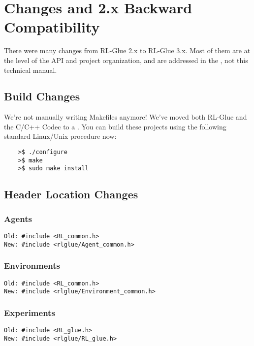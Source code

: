 \documentclass[11pt]{article}
\begin{document}
\section{Changes and 2.x Backward Compatibility}
There were many changes from RL-Glue 2.x to RL-Glue 3.x.  Most of them are at the level of the API and project organization, and are addressed in the , not this technical manual.

\subsection{Build Changes}
We're not manually writing Makefiles anymore!  We've moved both RL-Glue and the C/C++ Codec to a .
You can build these projects using the following standard Linux/Unix procedure now:
\begin{verbatim}
	>$ ./configure
	>$ make
	>$ sudo make install
\end{verbatim}

\subsection{Header Location Changes}
\subsubsection{Agents}
\begin{verbatim}
Old: #include <RL_common.h>
New: #include <rlglue/Agent_common.h>
\end{verbatim}

\subsubsection{Environments}
\begin{verbatim}
Old: #include <RL_common.h>
New: #include <rlglue/Environment_common.h>
\end{verbatim}

\subsubsection{Experiments}
\begin{verbatim}
Old: #include <RL_glue.h>
New: #include <rlglue/RL_glue.h>
\end{verbatim}
\end{document}
